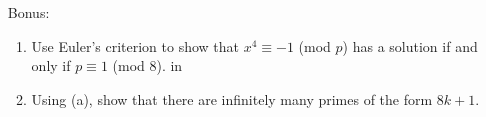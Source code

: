 \documentclass[12pt]{article}
\newcommand{\rmp}{\reversemarginpar\marginpar}
\renewcommand{\marginparsep}{-.4in}
\begin{document}
\begin{enumerate}
\renewcommand{\marginparsep}{-.2in}


\newpage
\item [Bonus:]
    \begin{enumerate}
    \item   Use \rmp{[10]} Euler's criterion to show that $x^4 \equiv -1$ (mod
$p$) has a solution if and only if $p\equiv 1$ (mod 8).
 in
    \item Using (a), show that there are infinitely many primes of the form $8k+1$.
    \end{enumerate}


\end{enumerate}


 \label{`last'}
\end{document}
